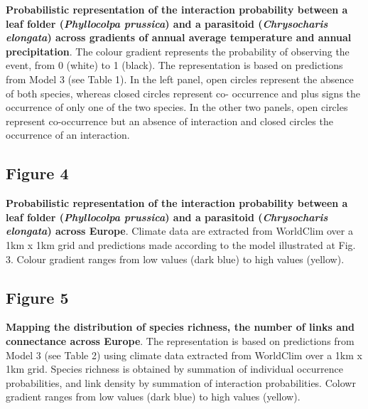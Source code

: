 \documentclass[12pt]{article}
\begin{document}
\textbf{Probabilistic representation of the interaction probability between a
leaf folder (\textit{Phyllocolpa prussica}) and a parasitoid
(\textit{Chrysocharis elongata}) across gradients of annual average
temperature and annual precipitation}. The colour gradient represents the
probability of observing the event, from 0 (white) to 1 (black). The
representation is based on predictions from Model 3 (see Table 1). In the left
panel, open circles represent the absence of both species, whereas closed
circles represent co- occurrence and plus signs the occurrence of only one of
the two species. In the other two panels, open circles represent co-occurrence
but an absence of interaction and closed circles the occurrence of an
interaction.

\subsection*{Figure 4}

\textbf{Probabilistic representation of the interaction probability between a
leaf folder (\textit{Phyllocolpa prussica}) and a parasitoid
(\textit{Chrysocharis elongata}) across Europe}. Climate data are extracted
from WorldClim over a 1km x 1km grid and predictions made according to the
model illustrated at Fig. 3. Colour gradient ranges from low values (dark
blue) to high values (yellow).



\subsection*{Figure 5}

\textbf{Mapping the distribution of species richness, the number of links and
connectance across Europe}. The representation is based on predictions from
Model 3 (see Table 2) using climate data extracted from WorldClim over a 1km x 1km grid. Species richness is obtained by summation of individual
occurrence probabilities, and link density by summation of interaction
probabilities. Colowr gradient ranges from low values (dark blue) to high
values (yellow).
\end{document}
